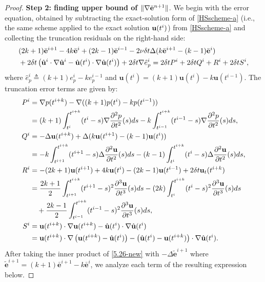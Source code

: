 \documentclass{article}
\theoremstyle{definition}                   %
\begin{document}
\begin{proof}
{\bf Step 2: finding upper bound of $\|\nabla\bar{\bf e}^{n+1} \|$}. 
We begin with the error equation, obtained by subtracting the
exact-solution form of \eqref{HSscheme-a} (i.e., the same scheme applied
to the exact solution ${\bf u}(t^i)$) from \eqref{HSscheme-a} and
collecting the truncation residuals on the right-hand side:
\begin{align}
&(2k+1)\bar{\mathbf{e}}^{i+1}  -4k\bar{\mathbf{e}}^i
+ (2k-1) \bar{\mathbf{e}}^{i-1}
-2\nu\delta t \Delta (k\bar{\mathbf{e}}^{i+1} - (k-1)\bar{\mathbf{e}}^i) \notag\\
&+2\delta t \left( \hat{\mathbf{u}}^i\cdot\nabla\hat{\mathbf{u}}^i 
-\hat{\mathbf{u}}(t^i)\cdot\nabla\hat{\mathbf{u}}(t^i)\right) 
+ 2\delta t \nabla\hat{e}^i_p = 2\delta t P^i + 2\delta t Q^i + R^i + 2\delta t S^i,
\label{5.26-new}
\end{align}
where $\hat{e}^i_p\triangleq (k+1)e^i_p - k e^{i-1}_p$ and 
$\hat{\mathbf{u}}(t^i) = (k+1){\mathbf{u}}(t^i) - k{\mathbf{u}}(t^{i-1})$.
%
The truncation error terms are given by:
\begin{align}
P^i &= \nabla p(t^{i+k}) - \nabla ((k+1)p(t^i) - k p(t^{i-1})) \notag\\
&=(k+1) \int_{t^i}^{t^{i+k}}  (t^i-s) \nabla \frac{\partial^2 p}{\partial t^2} (s) ds
- k\int_{t^{i-1}}^{t^{i+k}} (t^{i-1}-s) \nabla\frac{\partial^2 p}{\partial t^2}(s) ds,
\label{5.27-new}
\\
Q^i &= -\Delta {\mathbf{u}}(t^{i+k}) + \Delta (k {\mathbf{u}}(t^{i+1}) - (k-1){\mathbf{u}}(t^{i})) \notag\\
&=-k \int_{t^{i+1}}^{t^{i+k}}  (t^{i+1}-s) \Delta \frac{\partial^2 {\mathbf{u}}}{\partial t^2} (s) ds
- (k-1) \int_{t^i}^{t^{i+k}} (t^{i}-s) \Delta \frac{\partial^2 {\mathbf{u}}}{\partial t^2}(s) ds,
\label{5.28-new}
\\
R^i &= -(2k+1) {\mathbf{u}}(t^{i+1}) + 4k {\mathbf{u}}(t^{i}) 
- (2k-1){\mathbf{u}}(t^{i-1})
+2\delta t {\mathbf{u}}_t(t^{i+k}) \notag\\
&=\frac{2k+1}{2} \int_{t^{i+1}}^{t^{i+k}}  (t^{i+1}-s)^2  \frac{\partial^3 {\mathbf{u}}}{\partial t^3} (s) ds
- (2k) \int_{t^i}^{t^{i+k}} (t^{i}-s)^2 
\frac{\partial^3 {\mathbf{u}}}{\partial t^3}(s) ds
\notag \\
&\quad + \frac{2k-1}{2} \int_{t^{i-1}}^{t^{i+k}} (t^{i-1}-s)^2 
\frac{\partial^3 {\mathbf{u}}}{\partial t^3}(s) ds,
\label{5.29-new}
\\
S^i &= {\mathbf{u}}(t^{i+k}) \cdot \nabla{\mathbf{u}}(t^{i+k})
-\hat{\mathbf{u}}(t^i)\cdot\nabla\hat{\mathbf{u}}(t^i)
\notag\\
&= {\mathbf{u}}(t^{i+k})\cdot\nabla\left({\mathbf{u}}(t^{i+k}) 
- \hat{\mathbf{u}}(t^i)\right)
- \left(\hat{\mathbf{u}}(t^i)-{\mathbf{u}}(t^{i+k})\right)\cdot\nabla\hat{\mathbf{u}}(t^i).
\label{5.30-new}
\end{align}
%
After taking the inner product of \eqref{5.26-new} with $-\Delta\tilde{\mathbf{e}}^{i+1}$ where $\tilde{\mathbf{e}}^{i+1} = (k+1)\bar{\mathbf{e}}^{i+1} - k\bar{\mathbf{e}}^i$, we analyze each term of the resulting expression below.
%


\end{proof}
\end{document}

